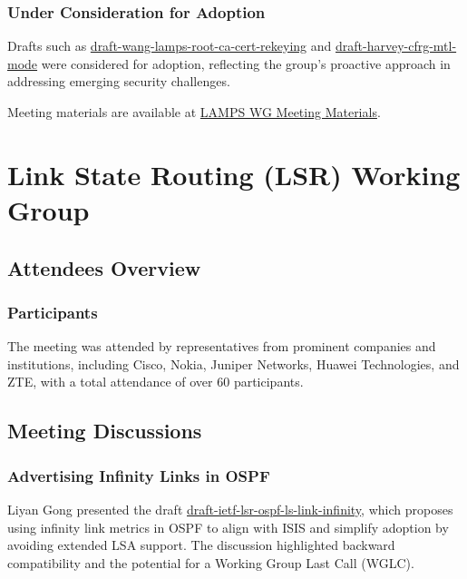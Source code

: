 \documentclass{article}
\begin{document}
\subsubsection{Under Consideration for Adoption}
Drafts such as \href{https://datatracker.ietf.org/doc/html/draft-wang-lamps-root-ca-cert-rekeying}{draft-wang-lamps-root-ca-cert-rekeying} and \href{https://datatracker.ietf.org/doc/html/draft-harvey-cfrg-mtl-mode}{draft-harvey-cfrg-mtl-mode} were considered for adoption, reflecting the group's proactive approach in addressing emerging security challenges.

Meeting materials are available at \href{https://www.ietf.org/proceedings/121/lamps.html}{LAMPS WG Meeting Materials}.




\newpage

\section{Link State Routing (LSR) Working Group}

\subsection{Attendees Overview}
\subsubsection{Participants}
The meeting was attended by representatives from prominent companies and institutions, including Cisco, Nokia, Juniper Networks, Huawei Technologies, and ZTE, with a total attendance of over 60 participants.

\subsection{Meeting Discussions}

\subsubsection{Advertising Infinity Links in OSPF}
Liyan Gong presented the draft \href{https://datatracker.ietf.org/doc/html/draft-ietf-lsr-ospf-ls-link-infinity}{draft-ietf-lsr-ospf-ls-link-infinity}, which proposes using infinity link metrics in OSPF to align with ISIS and simplify adoption by avoiding extended LSA support. The discussion highlighted backward compatibility and the potential for a Working Group Last Call (WGLC).
\end{document}
